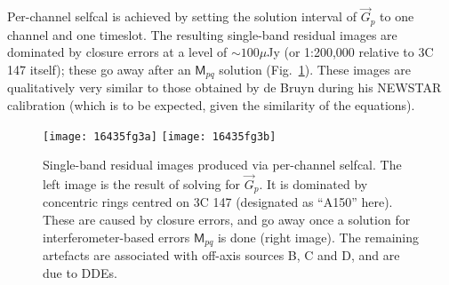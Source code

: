 \documentclass{aa}
\newcommand{\jones}[2]{\vec {#1}_{#2}}
\newcommand{\coh}[2]{\mathsf{{#1}}_{{#2}}}
\begin{document}
Per-channel selfcal is achieved by setting the solution interval of $\jones{G}{p}$ to one channel and one timeslot. The resulting single-band residual images are dominated by closure errors at a level of $\sim 100 \mu$Jy (or 1:200,000 relative to 3C 147 itself); these go away after an $\coh{M}{pq}$ solution (Fig.~\ref{fig:Gsol}). These images are qualitatively very similar to those obtained by de Bruyn during his NEWSTAR calibration (which is to be expected, given the similarity of the equations).

\begin{figure}
\begin{centering}
\texttt{[image: 16435fg3a]}%
\texttt{[image: 16435fg3b]}\par
\end{centering}
\caption{\label{fig:Gsol}Single-band residual images produced via per-channel selfcal. The left image is the result of solving for $\jones{G}{p}$. It is dominated by concentric rings centred on 3C 147 (designated as ``A150'' here). These are caused by closure errors, and go away once a solution for interferometer-based errors $\coh{M}{pq}$ is done (right image). The remaining artefacts are associated with off-axis sources B, C and D, and are due to DDEs. 
}
\end{figure}
\end{document}
